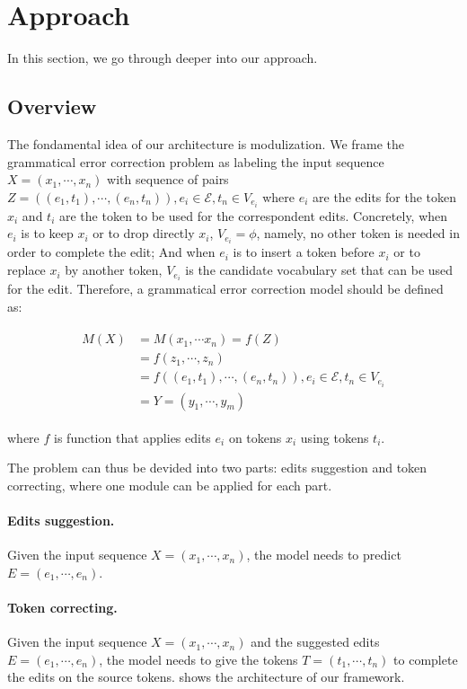 \section{Approach}
In this section, we go through deeper into our approach. 


\subsection{Overview} \label{sec:overview}

The fondamental idea of our architecture is modulization. We frame the grammatical error correction problem as labeling the input sequence $X = (x_1, \cdots, x_n)$ with sequence of pairs $Z = ((e_1, t_1), \cdots, (e_n, t_n)), e_i \in {\mathcal{E}}, t_n \in V_{e_i} $ where $e_i$ are the edits for the token $x_i$ and $t_i$ are the token to be used for the correspondent edits. Concretely, when $e_i$ is to keep $x_i$ or to drop directly $x_i$, $V_{e_i} = \phi$, namely, no other token is needed in order to complete the edit; And when $e_i$ is to insert a token before $x_i$ or to replace $x_i$ by another token, $V_{e_i}$ is the candidate vocabulary set that can be used for the edit. Therefore, a grammatical error correction model should be defined as:


\begin{align}
\begin{split}
{M(X)} & = M(x_1, \cdots x_n) = f(Z) \\
& = f(z_1, \cdots, z_n) \\
& = f((e_1,t_1), \cdots, (e_n, t_n)), e_i \in {\mathcal{E}}, t_n \in V_{e_i} \\
& = Y = (y_1, \cdots, y_m) 
\end{split}
\label{eq: GEC}
\end{align}


where $f$ is function that applies edits $e_i$ on tokens $x_i$ using tokens $t_i$.

The problem can thus be devided into two parts: edits suggestion and token correcting, where one module can be applied for each part. 

\paragraph{Edits suggestion. } Given the input sequence $X = (x_1, \cdots, x_n)$, the model needs to predict $E = (e_1, \cdots, e_n)$. 
\paragraph{Token correcting. } Given the input sequence $X = (x_1, \cdots, x_n)$ and the suggested edits $E = (e_1, \cdots, e_n)$, the model needs to give the tokens $T = (t_1, \cdots, t_n)$ to complete the edits on the source tokens.
shows the architecture of our framework. 



